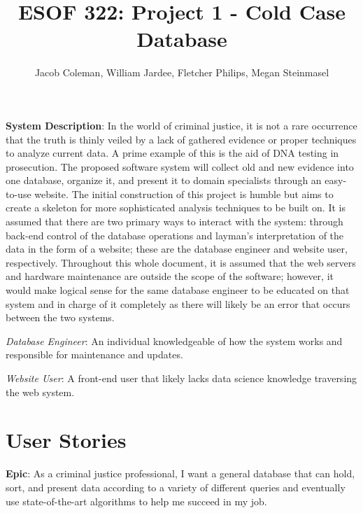 \documentclass[11pt]{article}
\begin{document}
\title{ESOF 322: Project 1 - Cold Case Database}
\author{Jacob Coleman, William Jardee, Fletcher Philips, Megan Steinmasel}
\maketitle



\textbf{System Description}: In the world of criminal justice, it is not a rare occurrence that the truth is thinly veiled by a lack of gathered evidence or proper techniques to analyze current data. A prime example of this is the aid of DNA testing in prosecution. The proposed software system will collect old and new evidence into one database, organize it, and present it to domain specialists through an easy-to-use website. The initial construction of this project is humble but aims to create a skeleton for more sophisticated analysis techniques to be built on. It is assumed that there are two primary ways to interact with the system: through back-end control of the database operations and layman's interpretation of the data in the form of a website; these are the database engineer and website user, respectively. Throughout this whole document, it is assumed that the web servers and hardware maintenance are outside the scope of the software; however, it would make logical sense for the same database engineer to be educated on that system and in charge of it completely as there will likely be an error that occurs between the two systems. \vspace{1.5em}

\textit{Database Engineer}: An individual knowledgeable of how the system works and responsible for maintenance and updates.\vspace{0.5em}

\textit{Website  User}: A front-end user that likely lacks data science knowledge traversing the web system.\vspace{1.5em}


\section*{User Stories}

\noindent\textbf{Epic}: As a criminal justice professional, I want a general database that can hold, sort, and present data according to a variety of different queries and eventually use state-of-the-art algorithms to help me succeed in my job.\vspace{0.5em}
\end{document}
